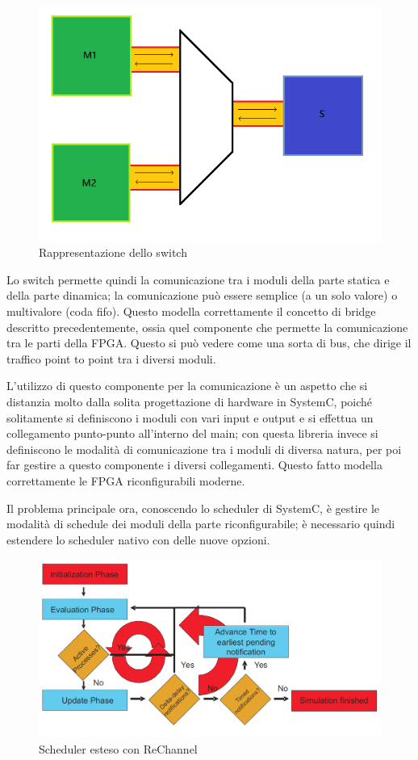 \documentclass[a4paper,titlepage]{book}
\begin{document}
\begin{figure}[ht]
\centering
\includegraphics[scale=0.5]{portal.png}
\caption{Rappresentazione dello switch}\label{fig:3}
\end{figure}

Lo switch permette quindi la comunicazione tra i moduli della parte statica e della parte dinamica; la comunicazione può essere semplice (a un solo valore) o multivalore (coda fifo). Questo modella correttamente il concetto di bridge descritto precedentemente, ossia quel componente che permette la comunicazione tra le parti della FPGA. Questo si può vedere come una sorta di bus, che dirige il traffico point to point tra i diversi moduli.

L'utilizzo di questo componente per la comunicazione è un aspetto che si distanzia molto dalla solita progettazione di hardware in SystemC, poiché solitamente si definiscono i moduli con vari input e output e si effettua un collegamento punto-punto all'interno del main; con questa libreria invece si definiscono le modalità di comunicazione tra i moduli di diversa natura, per poi far gestire a questo componente i diversi collegamenti. Questo fatto modella correttamente le FPGA riconfigurabili moderne.

Il problema principale ora, conoscendo lo scheduler di SystemC, è gestire le modalità di schedule dei moduli della parte riconfigurabile; è necessario quindi estendere lo scheduler nativo con delle nuove opzioni.

\begin{figure}[ht]
\centering
\includegraphics[scale=0.5]{scheduler_rechannel.png}
\caption{Scheduler esteso con ReChannel}\label{fig:4}
\end{figure}
\end{document}
